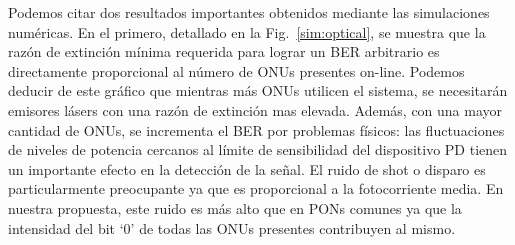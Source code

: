 Podemos citar dos resultados importantes obtenidos mediante las simulaciones numéricas. 
En el primero, detallado en la Fig.~\ref{sim:optical}, se muestra que la razón de extinción mínima requerida para lograr un BER arbitrario es directamente proporcional al número de ONUs presentes on-line.
Podemos deducir de este gráfico que mientras más ONUs utilicen el sistema, se necesitarán emisores lásers con una razón de extinción mas elevada. Además, con una mayor cantidad de ONUs, se incrementa el BER por problemas físicos: las fluctuaciones de niveles de potencia cercanos al límite de sensibilidad del dispositivo PD tienen un importante efecto en la detección de la señal.
El ruido de shot o disparo es particularmente preocupante ya que es proporcional a la fotocorriente media. En nuestra propuesta, este ruido es más alto que en PONs comunes ya que la intensidad del bit `0' de todas las ONUs presentes contribuyen al mismo.

